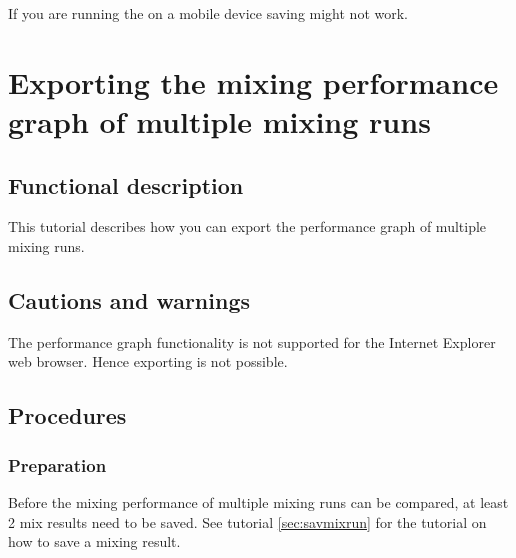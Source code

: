 If you are running the \applicationname{} on a mobile device saving might not work.


\section{Exporting the mixing performance graph of multiple mixing runs}
\label{sec:exportMultiGraph}

\subsection{Functional description}
This tutorial describes how you can export the performance graph of multiple mixing runs.

\subsection{Cautions and warnings}
The performance graph functionality is not supported for the Internet Explorer web browser. Hence exporting is not possible.

\subsection{Procedures}
\subsubsection{Preparation}
Before the mixing performance of multiple mixing runs can be compared, at least 2 mix results need to be saved. See tutorial \ref{sec:savmixrun} for the tutorial on how to save a mixing result.

